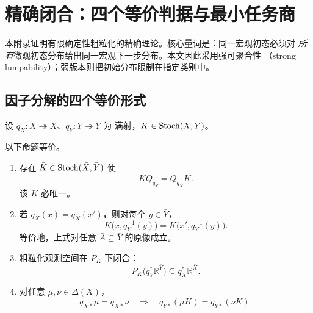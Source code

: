 \section{精确闭合：四个等价判据与最小任务商}
\label{app:exact-theory}

本附录证明有限确定性粗粒化的精确理论。核心量词是：同一宏观初态必须对
\emph{所有}微观初态分布给出同一宏观下一步分布。本文因此采用强可聚合性
（strong lumpability）；弱版本则把初始分布限制在指定类别中。

\subsection{因子分解的四个等价形式}

设 $q_X:X\twoheadrightarrow\bar X$、$q_Y:Y\twoheadrightarrow\bar Y$ 为
满射，$K\in\operatorname{Stoch}(X,Y)$。

\begin{theorem}[有限确定性粗粒化的四个等价判据]
\label{thm:app-four-equivalences}
以下命题等价。
\begin{enumerate}
  \item 存在 $\bar K\in\operatorname{Stoch}(\bar X,\bar Y)$ 使
  \begin{equation}
    KQ_{q_Y}=Q_{q_X}\bar K.
    \label{eq:app-exact-square}
  \end{equation}
  该 $\bar K$ 必唯一。
  \item 若 $q_X(x)=q_X(x')$，则对每个 $\bar y\in\bar Y$，
  \begin{equation}
    K\bigl(x,q_Y^{-1}(\bar y)\bigr)
    =K\bigl(x',q_Y^{-1}(\bar y)\bigr).
    \label{eq:app-block-probability}
  \end{equation}
  等价地，上式对任意 $\bar A\subseteq\bar Y$ 的原像成立。
  \item 粗粒化观测空间在 $P_K$ 下闭合：
  \begin{equation}
    P_K\bigl(q_Y^*\mathbb R^{\bar Y}\bigr)
    \subseteq q_X^*\mathbb R^{\bar X}.
    \label{eq:app-observable-invariance}
  \end{equation}
  \item 对任意 $\mu,\nu\in\Delta(X)$，
  \begin{equation}
   q_{X*}\mu=q_{X*}\nu
   \quad\Longrightarrow\quad
   q_{Y*}(\mu K)=q_{Y*}(\nu K).
   \label{eq:app-distribution-autonomy}
  \end{equation}
\end{enumerate}
\end{theorem}

